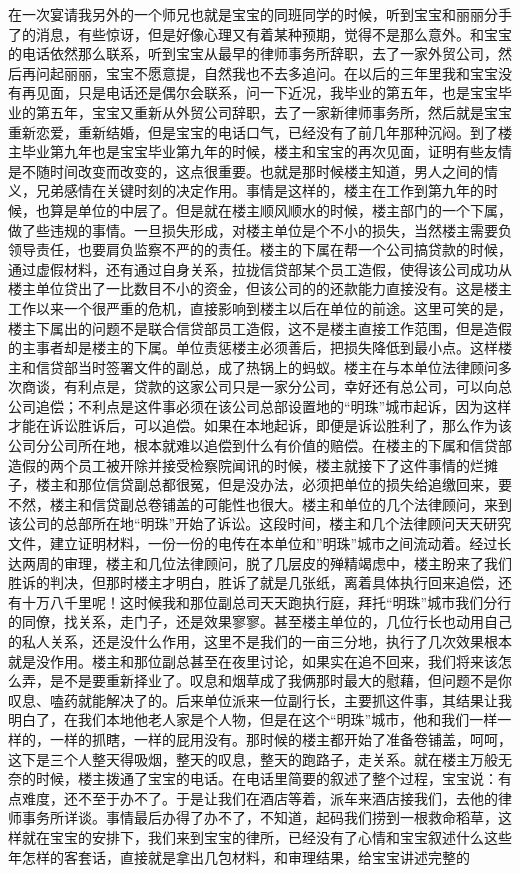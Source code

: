在一次宴请我另外的一个师兄也就是宝宝的同班同学的时候，听到宝宝和丽丽分手了的消息，有些惊讶，但是好像心理又有着某种预期，觉得不是那么意外。和宝宝的电话依然那么联系，听到宝宝从最早的律师事务所辞职，去了一家外贸公司，然后再问起丽丽，宝宝不愿意提，自然我也不去多追问。在以后的三年里我和宝宝没有再见面，只是电话还是偶尔会联系，问一下近况，我毕业的第五年，也是宝宝毕业的第五年，宝宝又重新从外贸公司辞职，去了一家新律师事务所，然后就是宝宝重新恋爱，重新结婚，但是宝宝的电话口气，已经没有了前几年那种沉闷。到了楼主毕业第九年也是宝宝毕业第九年的时候，楼主和宝宝的再次见面，证明有些友情是不随时间改变而改变的，这点很重要。也就是那时候楼主知道，男人之间的情义，兄弟感情在关键时刻的决定作用。事情是这样的，楼主在工作到第九年的时候，也算是单位的中层了。但是就在楼主顺风顺水的时候，楼主部门的一个下属，做了些违规的事情。一旦损失形成，对楼主单位是个不小的损失，当然楼主需要负领导责任，也要肩负监察不严的的责任。楼主的下属在帮一个公司搞贷款的时候，通过虚假材料，还有通过自身关系，拉拢信贷部某个员工造假，使得该公司成功从楼主单位贷出了一比数目不小的资金，但该公司的的还款能力直接没有。这是楼主工作以来一个很严重的危机，直接影响到楼主以后在单位的前途。这里可笑的是，楼主下属出的问题不是联合信贷部员工造假，这不是楼主直接工作范围，但是造假的主事者却是楼主的下属。单位责惩楼主必须善后，把损失降低到最小点。这样楼主和信贷部当时签署文件的副总，成了热锅上的蚂蚁。楼主在与本单位法律顾问多次商谈，有利点是，贷款的这家公司只是一家分公司，幸好还有总公司，可以向总公司追偿；不利点是这件事必须在该公司总部设置地的“明珠”城市起诉，因为这样才能在诉讼胜诉后，可以追偿。如果在本地起诉，即便是诉讼胜利了，那么作为该公司分公司所在地，根本就难以追偿到什么有价值的赔偿。在楼主的下属和信贷部造假的两个员工被开除并接受检察院闻讯的时候，楼主就接下了这件事情的烂摊子，楼主和那位信贷副总都很冤，但是没办法，必须把单位的损失给追缴回来，要不然，楼主和信贷副总卷铺盖的可能性也很大。楼主和单位的几个法律顾问，来到该公司的总部所在地“明珠”开始了诉讼。这段时间，楼主和几个法律顾问天天研究文件，建立证明材料，一份一份的电传在本单位和”明珠”城市之间流动着。经过长达两周的审理，楼主和几位法律顾问，脱了几层皮的殚精竭虑中，楼主盼来了我们胜诉的判决，但那时楼主才明白，胜诉了就是几张纸，离着具体执行回来追偿，还有十万八千里呢！这时候我和那位副总司天天跑执行庭，拜托“明珠”城市我们分行的同僚，找关系，走门子，还是效果寥寥。甚至楼主单位的，几位行长也动用自己的私人关系，还是没什么作用，这里不是我们的一亩三分地，执行了几次效果根本就是没作用。楼主和那位副总甚至在夜里讨论，如果实在追不回来，我们将来该怎么弄，是不是要重新择业了。叹息和烟草成了我俩那时最大的慰藉，但问题不是你叹息、嗑药就能解决了的。后来单位派来一位副行长，主要抓这件事，其结果让我明白了，在我们本地他老人家是个人物，但是在这个“明珠”城市，他和我们一样一样的，一样的抓瞎，一样的屁用没有。那时候的楼主都开始了准备卷铺盖，呵呵，这下是三个人整天得吸烟，整天的叹息，整天的跑路子，走关系。就在楼主万般无奈的时候，楼主拨通了宝宝的电话。在电话里简要的叙述了整个过程，宝宝说：有点难度，还不至于办不了。于是让我们在酒店等着，派车来酒店接我们，去他的律师事务所详谈。事情最后办得了办不了，不知道，起码我们捞到一根救命稻草，这样就在宝宝的安排下，我们来到宝宝的律所，已经没有了心情和宝宝叙述什么这些年怎样的客套话，直接就是拿出几包材料，和审理结果，给宝宝讲述完整的